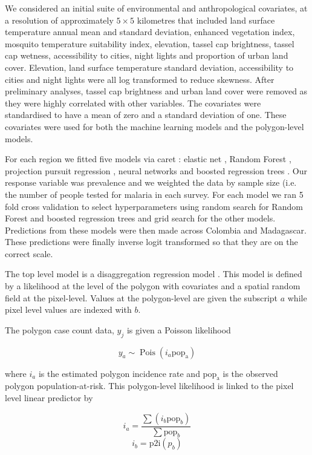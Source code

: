 \documentclass[11pt]{article}
\begin{document}
We considered an initial suite of environmental and anthropological covariates, at a resolution of approximately $5 \times 5$ kilometres that included land surface temperature annual mean and standard deviation, enhanced vegetation index, mosquito temperature suitability index, elevation, tassel cap brightness, tassel cap wetness, accessibility to cities, night lights and proportion of urban land cover. 
Elevation, land surface temperature standard deviation, accessibility to cities and night lights were all log transformed to reduce skewness. 
After preliminary analyses, tassel cap brightness and urban land cover were removed as they were highly correlated with other variables. 
The covariates were standardised to have a mean of zero and a standard deviation of one. 
These covariates were used for both the machine learning models and the polygon-level models.

For each region we fitted five models via caret \cite{caret}: elastic net \cite{enet}, Random Forest \cite{ranger}, projection pursuit regression \cite{PPR}, neural networks \cite{nnet} and boosted regression trees \cite{gbm}.
Our response variable was prevalence and we weighted the data by sample size (i.e. the number of people tested for malaria in each survey.
For each model we ran 5 fold cross validation to select hyperparameters using random search for Random Forest and boosted regression trees and grid search for the other models. 
Predictions from these models were then made across Colombia and Madagascar.
These predictions were finally inverse logit transformed so that they are on the correct scale.

The top level model is a disaggregation regression model \cite{sturrock2014fine, wilson2017pointless, law2018variational, taylor2017continuous, li2012log}.
This model is defined by a likelihood at the level of the polygon with covariates and a spatial random field at the pixel-level. 
Values at the polygon-level are given the subscript $a$ while pixel level values are indexed with $b$.

The polygon case count data, $y_j$ is given a Poisson likelihood

$$y_a \sim \operatorname{Pois}(i_a\mathrm{pop_a})$$

where $i_a$ is the estimated polygon incidence rate and $\mathrm{pop_a}$ is the observed polygon population-at-risk. 
This polygon-level likelihood is linked to the pixel level linear predictor by 

$$i_a = \frac{ \sum(i_b \mathrm{pop}_b)}{\sum  \mathrm{pop}_b} $$
$$i_b = \mathrm{p2i}(p_b)$$
\end{document}
